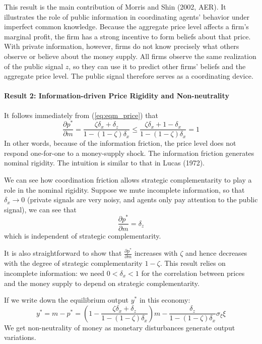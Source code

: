 \documentclass[12pt]{article}
\begin{document}
This result is the main contribution of Morris and Shin (2002, AER). It illustrates the role of public information in coordinating agents' behavior under imperfect common knowledge. Because the aggregate price level affects a firm's marginal profit, the firm has a strong incentive to form beliefs about that price. With private information, however, firms do not know precisely what others observe or believe about the money supply. All firms observe the same realization of the public signal $z$, so they can use it to predict other firms' beliefs and the aggregate price level. The public signal therefore serves as a coordinating device.

\paragraph{Result 2: Information-driven Price Rigidity and Non-neutrality \\ [6pt]}

It follows immediately from (\ref{eq:eqm_price}) that
\begin{equation}
	\frac{\partial p^*}{\partial m} = \frac{\zeta \delta_x + \delta_z}{1 - (1-\zeta) \delta_x} \leq \frac{\zeta \delta_x + 1 - \delta_x}{1 - (1-\zeta) \delta_x} = 1
\end{equation}
In other words, because of the information friction, the price level does not respond one-for-one to a money-supply shock. The information friction generates nominal rigidity. The intuition is similar to that in Lucas (1972).

We can see how coordination friction allows strategic complementarity to play a role in the nominal rigidity. Suppose we mute incomplete information, so that $\delta_x \to 0$ (private signals are very noisy, and agents only pay attention to the public signal), we can see that 
\[\frac{\partial p^*}{\partial m} = \delta_z\]
which is independent of strategic complementarity.   

It is also straightforward to show that $\frac{\partial p^*}{\partial m}$ increases with $\zeta$ and hence decreases with the degree of strategic complementarity $1- \zeta$. This result relies on incomplete information: we need $0 < \delta_x < 1$ for the correlation between prices and the money supply to depend on strategic complementarity.

If we write down the equilibrium output $y^*$ in this economy:
\[y^* = m - p^* = \left(1 - \frac{\zeta \delta_x + \delta_z}{1 - (1-\zeta) \delta_x}\right) m - \frac{\delta_z}{1 - (1-\zeta) \delta_x }\sigma_\xi \xi\] 
We get non-neutrality of money as monetary disturbances generate output variations.
\end{document}
